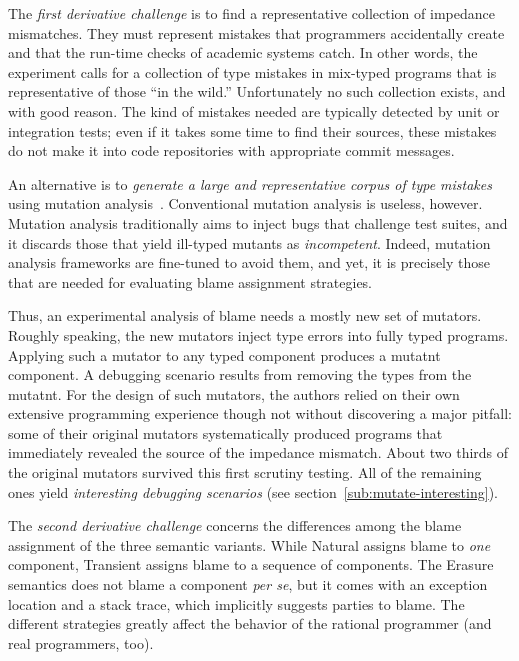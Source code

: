 
The {\em first derivative challenge\/} is to find a representative collection of
impedance mismatches. They must represent mistakes that programmers accidentally
create and that the run-time checks of academic systems catch. In other words,
the experiment calls for a collection of type mistakes in mix-typed programs
that is representative of those ``in the wild.''  Unfortunately no such
collection exists, and with good reason. The kind of mistakes needed are
typically detected by unit or integration tests; even if it takes some time to
find their sources, these mistakes do not make it into code repositories with
appropriate commit messages.

An alternative is to {\em generate a large and representative corpus of type
mistakes \/} using mutation analysis~\cite{lipton1971fault, demillo1978hints,
jia2011analysis}.  Conventional mutation analysis is useless, however. Mutation
analysis traditionally aims to inject bugs that challenge test suites, and it
discards those that yield ill-typed mutants as \emph{incompetent}.  Indeed,
mutation analysis frameworks are fine-tuned to avoid them, and yet, it is
precisely those that are needed for evaluating blame assignment strategies.

Thus, an experimental analysis of blame needs a mostly new set of mutators.
Roughly speaking, the new mutators inject type errors into fully typed programs.
Applying such a mutator to any typed component produces a mutatnt component.  A
debugging scenario results from removing the types from the mutatnt. For the
design of such mutators, the authors relied on their own extensive programming
experience though not without discovering a major pitfall: some of their
original mutators systematically produced programs that immediately revealed the
source of the impedance mismatch. About two thirds of the original mutators
survived this first scrutiny testing. All of the remaining ones yield {\em
interesting debugging scenarios\/} (see section~\ref{sub:mutate-interesting}).

The {\em second derivative challenge\/} concerns the differences among the blame
assignment of the three semantic variants.  While Natural assigns blame to {\em
one\/} component, Transient assigns blame to a sequence of components. The
Erasure semantics does not blame a component {\it per se\/}, but it comes with
an exception location and a stack trace, which implicitly suggests parties to
blame.  The different strategies greatly affect the behavior of the rational
programmer (and real programmers, too).

